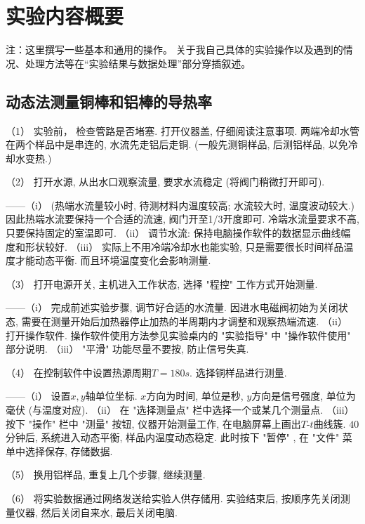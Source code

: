 \documentclass[11pt]{article}
\begin{document}
\section{实验内容概要}
\begin{kaishu}
    注：这里撰写一些基本和通用的操作。
关于我自己具体的实验操作以及遇到的情况、处理方法等在“实验结果与数据处理”部分穿插叙述。
\end{kaishu}

\subsection{动态法测量铜棒和铝棒的导热率}



    （1） 实验前， 检查管路是否堵塞. 打开仪器盖, 仔细阅读注意事项. 两端冷却水管在两个样品中是串连的, 水流先走铝后走铜. (一般先测铜样品, 后测铝样品, 以免冷却水变热.)
    
    （2） 打开水源, 从出水口观察流量, 要求水流稳定 (将阀门稍微打开即可).
    
       ——（i） (热端水流量较小时, 待测材料内温度较高; 水流较大时, 温度波动较大.) 因此热端水流要保持一个合适的流速, 阀门开至1/3开度即可. 冷端水流量要求不高, 只要保持固定的室温即可. 
        （ii） 调节水流: 保持电脑操作软件的数据显示曲线幅度和形状较好.
        （iii） 实际上不用冷端冷却水也能实验, 只是需要很长时间样品温度才能动态平衡. 而且环境温度变化会影响测量. 



    （3） 打开电源开关, 主机进入工作状态, 选择 "程控" 工作方式开始测量.

        ——（i） 完成前述实验步骤, 调节好合适的水流量. 因进水电磁阀初始为关闭状态, 需要在测量开始后加热器停止加热的半周期内才调整和观察热端流速. 
        （ii） 打开操作软件. 操作软件使用方法参见实验桌内的 "实验指导" 中 "操作软件使用" 部分说明.
        （iii） "平滑" 功能尽量不要按, 防止信号失真. 


    （4） 在控制软件中设置热源周期$T = 180\unit{s}$. 选择铜样品进行测量. 

    ——（i） 设置$x,y$轴单位坐标. $x$方向为时间, 单位是秒, $y$方向是信号强度, 单位为毫伏 (与温度对应). 
    （ii） 在 "选择测量点" 栏中选择一个或某几个测量点. 
    （iii） 按下 "操作" 栏中 "测量" 按钮, 仪器开始测量工作, 在电脑屏幕上画出$T$-$t$曲线簇. $40$分钟后, 系统进入动态平衡, 样品内温度动态稳定. 此时按下 "暂停" , 在 "文件" 菜单中选择保存, 存储数据.

    （5） 换用铝样品, 重复上几个步骤, 继续测量.

    （6） 将实验数据通过网络发送给实验人供存储用. 实验结束后, 按顺序先关闭测量仪器, 然后关闭自来水, 最后关闭电脑. 
\end{document}
